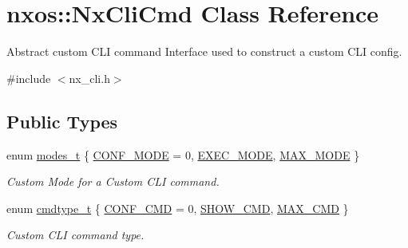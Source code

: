 \hypertarget{classnxos_1_1_nx_cli_cmd}{}\section{nxos\+:\+:Nx\+Cli\+Cmd Class Reference}
\label{classnxos_1_1_nx_cli_cmd}


Abstract custom C\+LI command Interface used to construct a custom C\+LI config.  




{\ttfamily \#include $<$nx\+\_\+cli.\+h$>$}

\subsection*{Public Types}
\begin{DoxyCompactItemize}
\item 
enum \mbox{\hyperlink{classnxos_1_1_nx_cli_cmd_a72999b2e8f2995bbb19be346d875e3ce}{modes\+\_\+t}} \{ \mbox{\hyperlink{classnxos_1_1_nx_cli_cmd_a72999b2e8f2995bbb19be346d875e3cea5f01458d92031d6ca875f201bd8d0bb1}{C\+O\+N\+F\+\_\+\+M\+O\+DE}} = 0, 
\mbox{\hyperlink{classnxos_1_1_nx_cli_cmd_a72999b2e8f2995bbb19be346d875e3cea9213e9b4feb7ead0d2333bc83bfc5cdb}{E\+X\+E\+C\+\_\+\+M\+O\+DE}}, 
\mbox{\hyperlink{classnxos_1_1_nx_cli_cmd_a72999b2e8f2995bbb19be346d875e3ceaedb25d06f68762ba3a8c8bc831a14c6f}{M\+A\+X\+\_\+\+M\+O\+DE}}
 \}
\begin{DoxyCompactList}\small\item\em Custom Mode for a Custom C\+LI command. \end{DoxyCompactList}\item 
enum \mbox{\hyperlink{classnxos_1_1_nx_cli_cmd_a82ed104f13c7859b24d3c0527f706be1}{cmdtype\+\_\+t}} \{ \mbox{\hyperlink{classnxos_1_1_nx_cli_cmd_a82ed104f13c7859b24d3c0527f706be1a95032ccdb393e24e4a57a330b3ba3142}{C\+O\+N\+F\+\_\+\+C\+MD}} = 0, 
\mbox{\hyperlink{classnxos_1_1_nx_cli_cmd_a82ed104f13c7859b24d3c0527f706be1a07e42d83caddae06870cbf324da56bbe}{S\+H\+O\+W\+\_\+\+C\+MD}}, 
\mbox{\hyperlink{classnxos_1_1_nx_cli_cmd_a82ed104f13c7859b24d3c0527f706be1a09e26af6ee427940926af9bd7ef2e73d}{M\+A\+X\+\_\+\+C\+MD}}
 \}
\begin{DoxyCompactList}\small\item\em Custom C\+LI command type. \end{DoxyCompactList}\end{DoxyCompactItemize}
